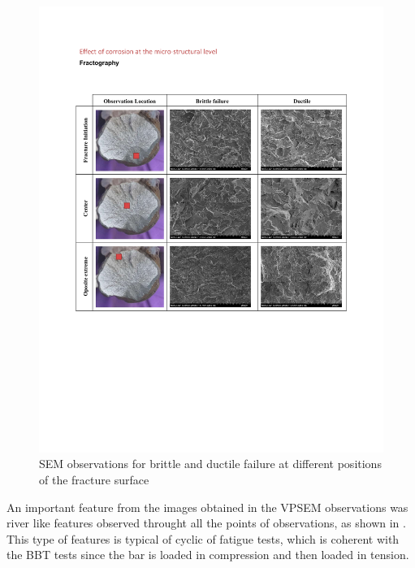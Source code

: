 \begin{figure}[htbp]
	\centering
	\includegraphics[width=1\textwidth]{VAC Thesis 2.0/Chapter-4/figs/BBT_fractography.pdf}
	\caption{SEM observations for brittle and ductile failure at different positions of the fracture surface}
	\label{fig:FractureSurfaces}
\end{figure}

An important feature from the images obtained in the VPSEM observations was river like features observed throught all the points of observations, as shown in . This type of features is typical of cyclic of fatigue  tests, which is coherent with the BBT tests since the bar is loaded in compression and then loaded in tension. %

